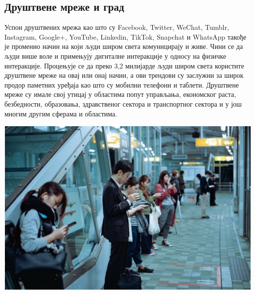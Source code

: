 \documentclass{article}
\begin{document}
\begin{multicols}{3}
\section*{Друштвене мреже и град}
\noindent Успон друштвених мрежа као што су Facebook, Twitter, WeChat, Tumblr, Instagram, Google+, YouTube, Linkedin, TikTok, Snapchat и WhatsApp такође је променио начин на који људи широм света комуницирају и живе. Чини се да људи више воле и примењују дигиталне интеракције у односу на физичке интеракције. 
Процењује се да преко 3,2 милијарде људи широм света користите друштвене мреже на овај или онај начин, а ови трендови су заслужни за широк продор паметних уређаја као што су мобилни телефони и таблети. Друштвене мреже су имале свој утицај у областима попут управљања, економског раста, безбедности, образовања, здравственог сектора и транспортног сектора и у још многим другим сферама и областима.

\begin{center}
    \vspace{1cm}
    \includegraphics[width=0.9\linewidth]{media/images/drustvene_mreze.png}
\end{center}

\end{multicols}
\end{document}
